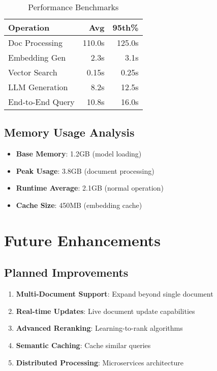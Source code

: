 \documentclass[10pt,a4paper,twocolumn]{article}
\begin{document}
\begin{table}[H]
\centering
\small
\begin{tabular}{@{}lrr@{}}
\toprule
\textbf{Operation} & \textbf{Avg} & \textbf{95th\%} \\
\midrule
Doc Processing & 110.0s & 125.0s \\
Embedding Gen & 2.3s & 3.1s \\
Vector Search & 0.15s & 0.25s \\
LLM Generation & 8.2s & 12.5s \\
End-to-End Query & 10.8s & 16.0s \\
\bottomrule
\end{tabular}
\caption{Performance Benchmarks}
\end{table}

\subsection{Memory Usage Analysis}

\begin{itemize}[leftmargin=1em]
    \item \textbf{Base Memory}: 1.2GB (model loading)
    \item \textbf{Peak Usage}: 3.8GB (document processing)
    \item \textbf{Runtime Average}: 2.1GB (normal operation)
    \item \textbf{Cache Size}: 450MB (embedding cache)
\end{itemize}

\section{Future Enhancements}

\subsection{Planned Improvements}

\begin{enumerate}[leftmargin=1.5em]
    \item \textbf{Multi-Document Support}: Expand beyond single document
    \item \textbf{Real-time Updates}: Live document update capabilities
    \item \textbf{Advanced Reranking}: Learning-to-rank algorithms
    \item \textbf{Semantic Caching}: Cache similar queries
    \item \textbf{Distributed Processing}: Microservices architecture
\end{enumerate}
\end{document}
